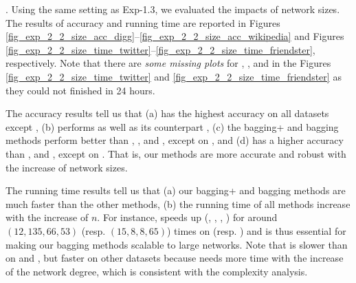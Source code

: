 . Using the same setting as Exp-1.3, we
evaluated the impacts of network sizes. The results of accuracy and running time
are reported in Figures \ref{fig_exp_2_2_size_acc_digg}--\ref{fig_exp_2_2_size_acc_wikipedia}
and Figures \ref{fig_exp_2_2_size_time_twitter}--\ref{fig_exp_2_2_size_time_friendster}, respectively.
Note that there are {\em some missing plots} for \NMF, \Aa, \RA and
\BIGCLAM in the Figures \ref{fig_exp_2_2_size_time_twitter} and
\ref{fig_exp_2_2_size_time_friendster} as they could not finished in 24 hours.



The accuracy results tell us that (a) \Biased has the highest accuracy
on all datasets except \Wikipedia, (b) \Biasedp performs as well as its counterpart \Biased,
(c) the bagging+ and bagging methods perform better than \NMF, \Aa, \RA
and \BIGCLAM, except \RA on \Wikipedia,
and (d) \NMF has a higher accuracy than \Aa, \RA
and \BIGCLAM, except \RA on \Wikipedia. That is,
our methods are more accurate and robust with the increase of network sizes.

The running time results tell us that (a) our bagging+ and bagging methods are much faster than the other methods,
(b) the running time of all methods increase with the increase of $n$. For
instance, \Biasedp speeds up (\NMF, \Aa, \RA, \BIGCLAM) for around $(12, 135, 66, 53)$ (resp. $(15, 8, 8, 65)$)
times on \Twitter (resp. \Friendster) and is thus essential for
making our bagging methods scalable to large networks. Note
that \NMF is slower than \BIGCLAM on \Digg and \YouTube,
but faster on other datasets because \BIGCLAM needs more time with
the increase of the network degree, which is consistent with the complexity analysis.


